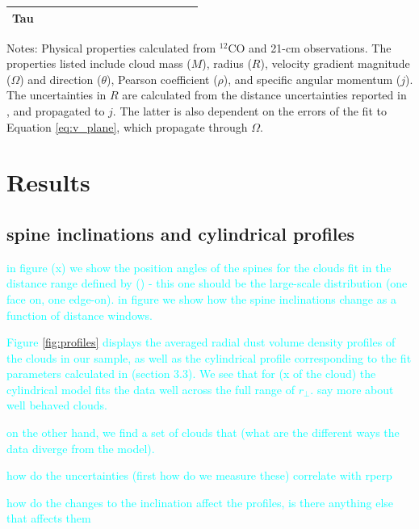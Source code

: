 \documentclass[twocolumn]{aastex631}
\newcommand{\rperp}{r_{\perp}}
\begin{document}
{\begin{table}
\begin{tabular}{|l|ccc|ccc|c||cccc||cc|c|}
 Tau& &   && & & &&   && && && \\ 
\hline
    \end{tabular}
    \begin{tablenotes}
    \item Notes: Physical properties calculated from $^{12}\mathrm{CO}$ and 21-cm observations. The properties listed include cloud mass ($M$), radius ($R$), velocity gradient magnitude ($\Omega$) and direction ($\theta$), Pearson coefficient ($\rho$), and specific angular momentum ($j$). The uncertainties in $R$ are calculated from the distance uncertainties reported in \citep{2019ApJ...879..125Z}, and propagated to $j$. The latter is also dependent on the errors of the fit to Equation \ref{eq:v_plane}, which propagate through $\Omega$.
    \end{tablenotes}
\end{table}

\section{Results}\label{sec:results}
\subsection{spine inclinations and cylindrical profiles}
\textcolor{cyan}{in figure (x) we show the position angles of the spines for the clouds fit in the distance range defined by () - this one should be the large-scale distribution (one face on, one edge-on). in figure we show how the spine inclinations change as a function of distance windows.}

\textcolor{cyan}{Figure \ref{fig:profiles} displays the averaged radial dust volume density
profiles of the clouds in our sample, as well as the cylindrical profile corresponding to the fit parameters calculated in (section 3.3). 
We see that for (x of the cloud) the cylindrical model fits the data well across the full range of $\rperp$.  say more about well behaved clouds.}

\textcolor{cyan}{on the other hand, we find a set of clouds that (what are the different ways the data diverge from the model).}

\textcolor{cyan}{how do the uncertainties (first how do we measure these) correlate with rperp }

\textcolor{cyan}{how do the changes to the inclination affect the profiles, is there anything else that affects them}


}
\end{document}
